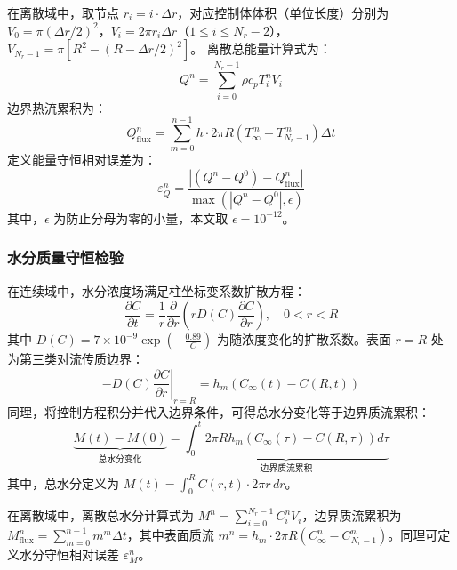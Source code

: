 \documentclass[withoutpreface,bwprint]{cumcm_thesis}
\begin{document}
在离散域中，取节点 \(r_i = i \cdot \Delta r\)，对应控制体体积（单位长度）分别为 \(V_0 = \pi (\Delta r/2)^2\)，\(V_i = 2\pi r_i \Delta r\)（\(1 \le i \le N_r-2\)），\(V_{N_r-1} = \pi [R^2 - (R - \Delta r/2)^2]\)。
离散总能量计算式为：
\begin{equation}
Q^n = \sum_{i=0}^{N_r-1} \rho c_p T_i^n V_i
\end{equation}
边界热流累积为：
\begin{equation}
Q_{\text{flux}}^n = \sum_{m=0}^{n-1} h \cdot 2\pi R \left( T_\infty^m - T_{N_r-1}^m \right) \Delta t
\end{equation}
定义能量守恒相对误差为：
\begin{equation}
\varepsilon_Q^n = \frac{\left| (Q^n - Q^0) - Q_{\text{flux}}^n \right|}{\max \left( |Q^n - Q^0|, \epsilon \right)}
\end{equation}
其中，\(\epsilon\) 为防止分母为零的小量，本文取 \(\epsilon = 10^{-12}\)。

\subsubsection{水分质量守恒检验}

在连续域中，水分浓度场满足柱坐标变系数扩散方程：
\begin{equation}
\frac{\partial C}{\partial t} = \frac{1}{r} \frac{\partial}{\partial r} \left( r D(C) \frac{\partial C}{\partial r} \right), \quad 0 < r < R
\end{equation}
其中 \(D(C) = 7 \times 10^{-9} \exp\left(-\frac{0.89}{C}\right)\) 为随浓度变化的扩散系数。表面 \(r=R\) 处为第三类对流传质边界：
\begin{equation}
-D(C) \left. \frac{\partial C}{\partial r} \right|_{r=R} = h_m \left( C_\infty(t) - C(R,t) \right)
\end{equation}
同理，将控制方程积分并代入边界条件，可得总水分变化等于边界质流累积：
\begin{equation}
\underbrace{M(t) - M(0)}_{\text{总水分变化}} = \underbrace{\int_0^t 2\pi R h_m \left( C_\infty(\tau) - C(R,\tau) \right) d\tau}_{\text{边界质流累积}}
\end{equation}
其中，总水分定义为 \(M(t) = \int_0^R C(r,t) \cdot 2\pi r \, dr\)。

在离散域中，离散总水分计算式为 \(M^n = \sum_{i=0}^{N_r-1} C_i^n V_i\)，边界质流累积为 \(M_{\text{flux}}^n = \sum_{m=0}^{n-1} m^m \Delta t\)，其中表面质流 \(m^n = h_m \cdot 2\pi R \left( C_\infty^n - C_{N_r-1}^n \right)\)。同理可定义水分守恒相对误差 \(\varepsilon_M^n\)。
\end{document}
